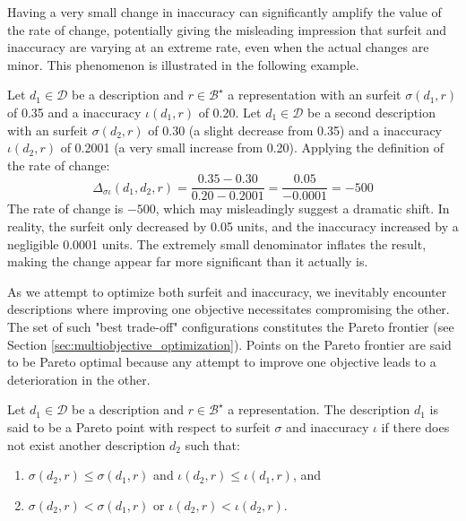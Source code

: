 Having a very small change in inaccuracy can significantly amplify the value of the rate of change, potentially giving the misleading impression that surfeit and inaccuracy are varying at an extreme rate, even when the actual changes are minor. This phenomenon is illustrated in the following example.

\begin{example}
Let $d_1 \in \mathcal{D}$ be a description and $r \in \mathcal{B}^\star$ a representation with an surfeit $\sigma(d_1, r)$ of 0.35 and a inaccuracy $\iota(d_1, r)$ of 0.20. Let $d_1 \in \mathcal{D}$ be a second description with an surfeit $\sigma(d_2, r)$ of 0.30 (a slight decrease from 0.35) and a inaccuracy $\iota(d_2, r)$ of 0.2001 (a very small increase from 0.20). Applying the definition of the rate of change:
\[
\Delta_{\sigma \iota} (d_1, d_2, r) = \frac{0.35 - 0.30}{0.20 - 0.2001} = \frac{0.05}{-0.0001} = -500
\]
The rate of change is $-500$, which may misleadingly suggest a dramatic shift. In reality, the surfeit only decreased by 0.05 units, and the inaccuracy increased by a negligible 0.0001 units. The extremely small denominator inflates the result, making the change appear far more significant than it actually is.
\end{example}

As we attempt to optimize both surfeit and inaccuracy, we inevitably encounter descriptions where improving one objective necessitates compromising the other. The set of such "best trade-off" configurations constitutes the Pareto frontier (see Section \ref{sec:multiobjective_optimization}). Points on the Pareto frontier are said to be Pareto optimal because any attempt to improve one objective leads to a deterioration in the other.

\begin{definition}
Let $d_1 \in \mathcal{D}$ be a description and $r \in \mathcal{B}^\star$ a representation. The description $d_1$ is said to be a Pareto point with respect to surfeit $\sigma$ and inaccuracy $\iota$ if there does not exist another description $d_2$ such that:
\begin{enumerate}
    \item $\sigma(d_2, r) \leq \sigma(d_1, r)$ and $\iota(d_2, r) \leq \iota(d_1, r)$, and
    \item $\sigma(d_2, r) < \sigma(d_1, r)$ or $\iota(d_2, r) < \iota(d_2, r)$.
\end{enumerate}
\end{definition}

